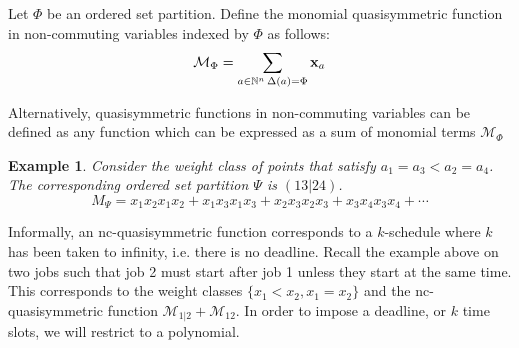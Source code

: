 \documentclass[12pt,reqno]{amsart}
\numberwithin{definition}{section}
\newtheorem{example}[definition]{Example}
\newcommand{\ncM}{\mathcal{M}}
\begin{document}
Let $\Phi$ be an ordered set partition.  Define the monomial quasisymmetric function in non-commuting variables indexed by $\Phi$ as follows:
$$\ncM_{\Phi} = \sum_{a \in \mathbb{N}^n \, \Delta(a) = \Phi} {\bf{x}}_{a}$$

Alternatively, quasisymmetric functions in non-commuting variables can be defined as any function which can be expressed as a sum of monomial terms $\ncM_{\Phi}$



\begin{example}

Consider the weight class of  points that satisfy $a_1 = a_3 < a_2 = a_4$.  The corresponding ordered set partition $\Psi$ is $(13|24)$.  
$$M_{\Psi} = x_1x_2x_1x_2 + x_1x_3x_1x_3 + x_2x_3x_2x_3 + x_3x_4x_3x_4 + \cdots$$  

\end{example}


Informally, an nc-quasisymmetric function corresponds to a
$k$-schedule where $k$ has been taken to infinity, i.e. there is no
deadline.  Recall the example above on two jobs such that job 2 must
start after job 1 unless they start at the same time.  This
corresponds to the weight classes $\{x_1 < x_2, x_1 = x_2\}$ and the
nc-quasisymmetric function $\ncM_{1|2} + \ncM_{12}$.  In order to
impose a deadline, or $k$ time slots, we will restrict to a
polynomial.
\end{document}
